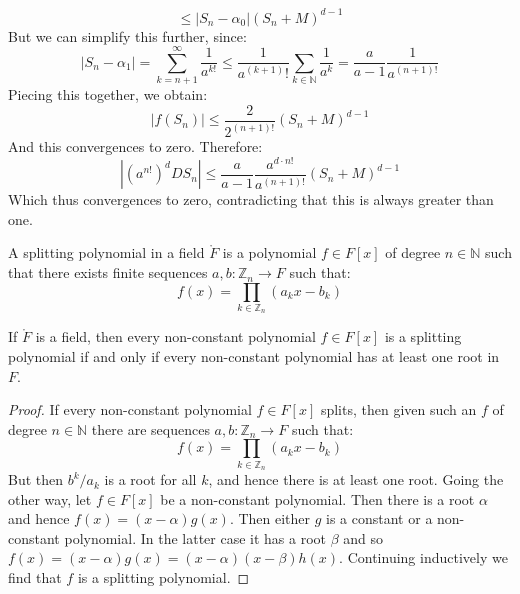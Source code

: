 \documentclass{article}                                                        %
\begin{document}
\begin{bproof}
\begin{equation}
                    \leq|S_{n}-\alpha_{0}|(S_{n}+M)^{d-1}
            \end{equation}
            But we can simplify this further, since:
            \begin{equation}
                |S_{n}-\alpha_{1}|=\sum_{k=n+1}^{\infty}\frac{1}{a^{k!}}
                \leq\frac{1}{a^{(k+1)}!}\sum_{k\in\mathbb{N}}\frac{1}{a^{k}}
                =\frac{a}{a-1}\frac{1}{a^{(n+1)!}}
            \end{equation}
            Piecing this together, we obtain:
            \begin{equation}
                |f(S_{n})|\leq\frac{2}{2^{(n+1)!}}(S_{n}+M)^{d-1}
            \end{equation}
            And this convergences to zero. Therefore:
            \begin{equation}
                |(a^{n!})^{d}DS_{n}|\leq\frac{a}{a-1}
                    \frac{a^{d\cdot{n!}}}{a^{(n+1)!}}(S_{n}+M)^{d-1}
            \end{equation}
            Which thus convergences to zero, contradicting that this is always
            greater than one.
        \end{bproof}
        \begin{definition}
            A splitting polynomial in a field $\ring{F}$ is a polynomial
            $f\in{F}[x]$ of degree $n\in\mathbb{N}$ such that there exists
            finite sequences $a,b:\mathbb{Z}_{n}\rightarrow{F}$ such that:
            \begin{equation}
                f(x)=\prod_{k\in\mathbb{Z}_{n}}(a_{k}x-b_{k})
            \end{equation}
        \end{definition}
        \begin{theorem}
            If $\ring{F}$ is a field, then every non-constant polynomial
            $f\in{F}[x]$ is a splitting polynomial if and only if every
            non-constant polynomial has at least one root in $F$.
        \end{theorem}
        \begin{proof}
            If every non-constant polynomial $f\in{F}[x]$ splits, then given
            such an $f$ of degree $n\in\mathbb{N}$ there are sequences
            $a,b:\mathbb{Z}_{n}\rightarrow{F}$ such that:
            \begin{equation}
                f(x)=\prod_{k\in\mathbb{Z}_{n}}(a_{k}x-b_{k})
            \end{equation}
            But then $b^{k}/a_{k}$ is a root for all $k$, and hence there is at
            least one root. Going the other way, let $f\in{F}[x]$ be a
            non-constant polynomial. Then there is a root $\alpha$ and hence
            $f(x)=(x-\alpha)g(x)$. Then either $g$ is a constant or a
            non-constant polynomial. In the latter case it has a root $\beta$
            and so $f(x)=(x-\alpha)g(x)=(x-\alpha)(x-\beta)h(x)$. Continuing
            inductively we find that $f$ is a splitting polynomial.
        \end{proof}
\end{document}
